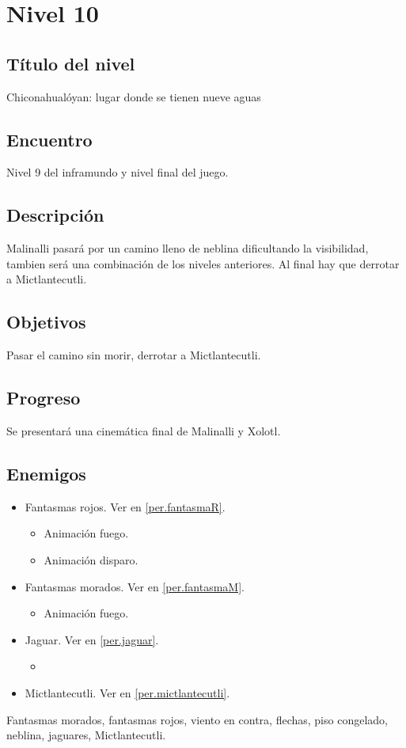\section{Nivel 10}
	\subsection{Título del nivel}
	Chiconahualóyan: lugar donde se tienen nueve aguas
	\subsection{Encuentro}
	Nivel 9 del inframundo y nivel final del juego.
	\subsection{Descripción}
	Malinalli pasará por un camino lleno de neblina dificultando la visibilidad, tambien será una combinación de los niveles anteriores. Al final hay que derrotar a Mictlantecutli.
	\subsection{Objetivos}
	Pasar el camino sin morir, derrotar a Mictlantecutli.
	\subsection{Progreso}
	Se presentará una cinemática final de Malinalli y Xolotl.
	\subsection{Enemigos}
	\begin{itemize}
		\item Fantasmas rojos. Ver en \ref{per.fantasmaR}.
		\begin{itemize}
				\item Animación fuego.
				\item Animación disparo.
		\end{itemize}
		\item Fantasmas morados. Ver en \ref{per.fantasmaM}.
		\begin{itemize}
				\item Animación fuego.
		\end{itemize}
		\item Jaguar. Ver en \ref{per.jaguar}.
			\begin{itemize}
				\item 
			\end{itemize}
		\item Mictlantecutli. Ver en \ref{per.mictlantecutli}.
	\end{itemize}
	Fantasmas morados, fantasmas rojos, viento en contra, flechas, piso congelado, neblina, jaguares, Mictlantecutli.
